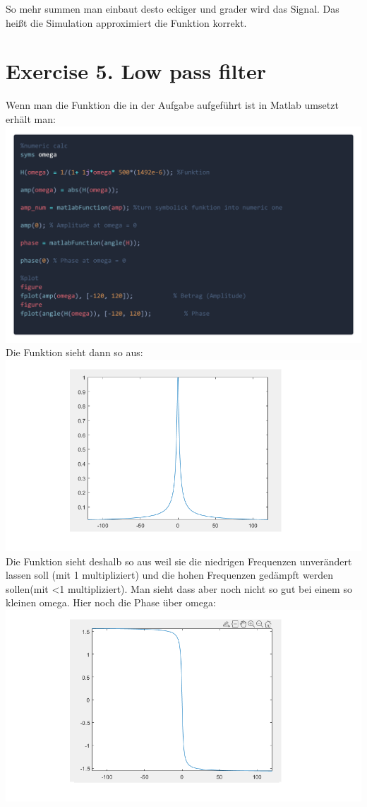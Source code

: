 \documentclass{scrartcl}
\begin{document}
So mehr summen man einbaut desto eckiger und grader wird das Signal. Das heißt die Simulation approximiert die Funktion korrekt.\\

\section*{Exercise 5. Low pass filter}
Wenn man die Funktion die in der Aufgabe aufgeführt ist in Matlab umsetzt erhält man:\\
\includegraphics[scale=0.18]{lowpass_filter_code.png}\\
Die Funktion sieht dann so aus:\\
\includegraphics[scale=0.8]{lowpass_filter_out.png}\\
Die Funktion sieht deshalb so aus weil sie die niedrigen Frequenzen unverändert lassen soll (mit 1 multipliziert) und die hohen Frequenzen gedämpft werden sollen(mit <1 multipliziert). Man sieht dass aber noch nicht so gut bei einem so kleinen omega. Hier noch die Phase über omega:\\
\includegraphics[scale=0.8]{lowpass_filter_out2.png}
\end{document}
